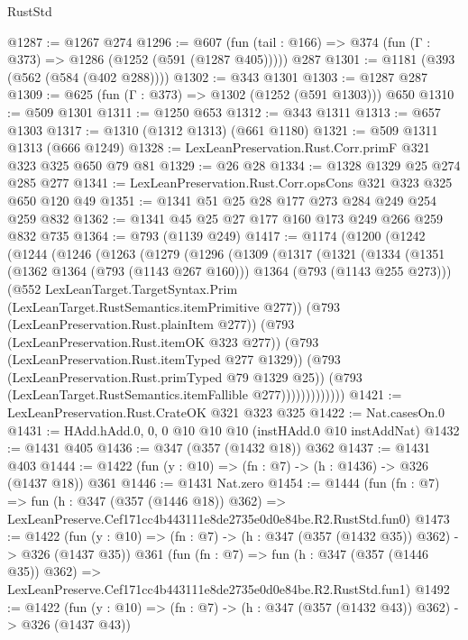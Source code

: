 \begin{lexlean}{RustStd}
\begin{coremodule}
@1287 := @1267 @274
@1296 := @607 (fun (tail : @166) => @374 (fun (Γ : @373) => @1286 (@1252 (@591 (@1287 @405))))) @287
@1301 := @1181 (@393 (@562 (@584 (@402 @288))))
@1302 := @343 @1301
@1303 := @1287 @287
@1309 := @625 (fun (Γ : @373) => @1302 (@1252 (@591 @1303))) @650
@1310 := @509 @1301
@1311 := @1250 @653
@1312 := @343 @1311
@1313 := @657 @1303
@1317 := @1310 (@1312 @1313) (@661 @1180)
@1321 := @509 @1311 @1313 (@666 @1249)
@1328 := LexLeanPreservation.Rust.Corr.primF @321 @323 @325 @650 @79 @81
@1329 := @26 @28
@1334 := @1328 @1329 @25 @274 @285 @277
@1341 := LexLeanPreservation.Rust.Corr.opsCons @321 @323 @325 @650 @120 @49
@1351 := @1341 @51 @25 @28 @177 @273 @284 @249 @254 @259 @832
@1362 := @1341 @45 @25 @27 @177 @160 @173 @249 @266 @259 @832 @735
@1364 := @793 (@1139 @249)
@1417 := @1174
    (@1200
      (@1242
        (@1244
          (@1246
            (@1263
              (@1279
                (@1296
                  (@1309
                    (@1317
                      (@1321
                        (@1334
                          (@1351
                            (@1362 @1364 (@793 (@1143 @267 @160)))
                            @1364
                            (@793 (@1143 @255 @273)))
                          (@552
                            LexLeanTarget.TargetSyntax.Prim
                            (LexLeanTarget.RustSemantics.itemPrimitive @277))
                          (@793 (LexLeanPreservation.Rust.plainItem @277))
                          (@793 (LexLeanPreservation.Rust.itemOK @323 @277))
                          (@793 (LexLeanPreservation.Rust.itemTyped @277 @1329))
                          (@793 (LexLeanPreservation.Rust.primTyped @79 @1329 @25))
                          (@793 (LexLeanTarget.RustSemantics.itemFallible @277)))))))))))))
@1421 := LexLeanPreservation.Rust.CrateOK @321 @323 @325
@1422 := Nat.casesOn.{0}
@1431 := HAdd.hAdd.{0, 0, 0} @10 @10 @10 (instHAdd.{0} @10 instAddNat)
@1432 := @1431 @405
@1436 := @347 (@357 (@1432 @18)) @362
@1437 := @1431 @403
@1444 := @1422 (fun (y : @10) => (fn : @7) -> (h : @1436) -> @326 (@1437 @18)) @361
@1446 := @1431 Nat.zero
@1454 := @1444
    (fun (fn : @7) =>
    fun (h : @347 (@357 (@1446 @18)) @362) =>
    LexLeanPreserve.Cef171cc4b443111e8de2735e0d0e84be.R2.RustStd.fun0)
@1473 := @1422
    (fun (y : @10) => (fn : @7) -> (h : @347 (@357 (@1432 @35)) @362) -> @326 (@1437 @35))
    @361
    (fun (fn : @7) =>
    fun (h : @347 (@357 (@1446 @35)) @362) =>
    LexLeanPreserve.Cef171cc4b443111e8de2735e0d0e84be.R2.RustStd.fun1)
@1492 := @1422
    (fun (y : @10) => (fn : @7) -> (h : @347 (@357 (@1432 @43)) @362) -> @326 (@1437 @43))

\end{coremodule}
\end{lexlean}
